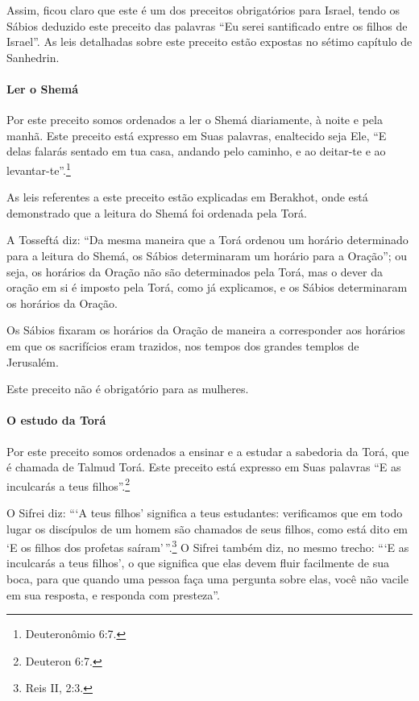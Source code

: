 Assim, ficou claro que este é um dos preceitos obrigatórios para
Israel, tendo os Sábios deduzido este preceito das palavras ``Eu serei
santificado entre os filhos de Israel''. As leis detalhadas sobre este
preceito estão expostas no sétimo capítulo de Sanhedrin\starr.

\paragraph{Ler o Shemá}

Por este preceito somos ordenados a ler o Shemá\starr{} diariamente, à noite e
pela manhã. Este preceito está expresso em Suas palavras, enaltecido
seja Ele, ``E delas falarás sentado em tua casa, andando pelo caminho, e
ao deitar-te e ao levantar-te''.\footnote{Deuteronômio 6:7.}

As leis referentes a este preceito estão explicadas em Berakhot\starr, onde
está demonstrado que a leitura do Shemá\starr{} foi ordenada pela Torá.

A Tosseftá\starr{} diz: ``Da mesma maneira que a Torá ordenou um horário
determinado para a leitura do Shemá\starr{}, os Sábios determinaram um horário
para a Oração''; ou seja, os horários da Oração não são determinados
pela Torá, mas o dever da oração em si é imposto pela Torá, como já
explicamos, e os Sábios determinaram os horários da Oração.

Os Sábios fixaram os horários da Oração de maneira a corresponder aos
horários em que os sacrifícios eram trazidos, nos tempos dos grandes
templos de Jerusalém.

Este preceito não é obrigatório para as mulheres.

\paragraph{O estudo da Torá}

Por este preceito somos ordenados a ensinar e a estudar a sabedoria da
Torá, que é chamada de Talmud Torá. Este preceito está expresso em
Suas palavras ``E as inculcarás a teus filhos''.\footnote{Deuteron 6:7.}

O Sifrei diz: ```A teus filhos' significa a teus estudantes: verificamos
que em todo lugar os discípulos de um homem são chamados de seus filhos,
como está dito em `E os filhos dos profetas saíram'\,''.\footnote{Reis II, 2:3.} O Sifrei também diz,
no mesmo trecho: ```E as inculcarás a teus filhos', o que significa que
elas devem fluir facilmente de sua boca, para que quando uma pessoa faça uma
pergunta sobre elas, você não vacile em sua resposta, e responda com
presteza''.

